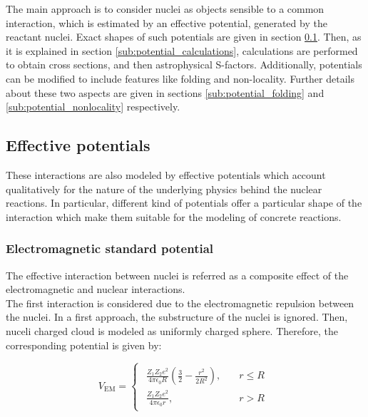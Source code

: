 \documentclass[openany]{book}
\begin{document}
The main approach is to consider nuclei as objects sensible to a common interaction, which is estimated by an effective potential, generated by the reactant nuclei. Exact shapes of such potentials are given in section \ref{sub:potential_effective}. Then, as it is explained in section \ref{sub:potential_calculations}, calculations are performed to obtain cross sections, and then astrophysical S-factors. Additionally, potentials can be modified to include features like folding and non-locality. Further details about these two aspects are given in sections \ref{sub:potential_folding} and \ref{sub:potential_nonlocality} respectively.

\subsection{Effective potentials} \label{sub:potential_effective}

These interactions are also modeled by effective potentials which account qualitatively for the nature of the underlying physics behind the nuclear reactions. In particular, different kind of potentials offer a particular shape of the interaction which make them suitable for the modeling of concrete reactions.

\subsubsection{Electromagnetic standard potential} \label{sub:potential_effective_EM}

The effective interaction between nuclei is referred as a composite effect of the electromagnetic and nuclear interactions.  \\

The first interaction is considered due to the electromagnetic repulsion between the nuclei. In a first approach, the  substructure of the nuclei is ignored. Then, nuceli charged cloud is modeled as uniformly charged sphere. Therefore, the corresponding potential is given by:

\begin{equation} \label{eq:potential_EM}
	V_{\mathrm{EM}} = 	\left\{\begin{array}{l}
		\begin{split}
			\frac{Z_1Z_2e^2}{4\pi\epsilon_0R}\left(\frac{3}{2} - \frac{r^2}{2R^2}\right), \quad &r \le R \\ 
			\frac{Z_1Z_2e^2}{4\pi\epsilon_0r}, \quad &r > R	
		\end{split}
	\end{array}\right.
\end{equation}
\end{document}
